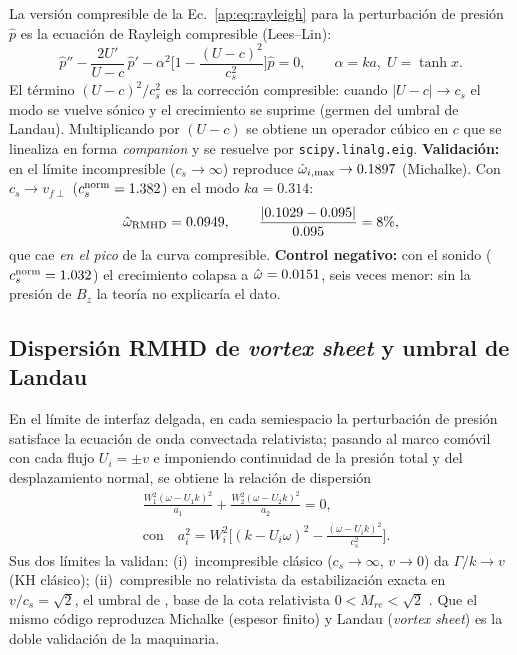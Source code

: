 \primerparrafo La versión compresible de la Ec.~\eqref{ap:eq:rayleigh} para la perturbación de presión $\hat p$ es la ecuación de Rayleigh compresible (Lees--Lin):
\begin{equation}
\hat p''-\frac{2U'}{U-c}\,\hat p'
 -\alpha^2\Big[1-\frac{(U-c)^2}{c_s^2}\Big]\hat p=0,
\qquad \alpha=ka,\;U=\tanh x .
\label{ap:eq:leeslin}
\end{equation}
El término $(U-c)^2/c_s^2$ es la corrección compresible: cuando $|U-c|\to c_s$ el modo se vuelve sónico y el crecimiento se suprime (germen del umbral de Landau). Multiplicando por $(U-c)$ se obtiene un operador cúbico en $c$ que se linealiza en forma \emph{companion} y se resuelve por \texttt{scipy.linalg.eig}. \textbf{Validación:} en el límite incompresible ($c_s\to\infty$) reproduce $\hat{\omega}_{i,\max}\to0.1897$ (Michalke). Con $c_s\to v_{f\perp}$ ($c_s^{\rm norm}=1.382$) en el modo $ka=0.314$:
\begin{equation}
\hat{\omega}_{\mathrm{RMHD}}=0.0949,\qquad \frac{|0.1029-0.095|}{0.095}=8\% ,
\end{equation}
que cae \emph{en el pico} de la curva compresible. \textbf{Control negativo:} con el sonido ($c_s^{\rm norm}=1.032$) el crecimiento colapsa a $\hat{\omega}=0.0151$, seis veces menor: sin la presión de $B_z$ la teoría no explicaría el dato.

\subsection{Dispersión RMHD de \emph{vortex sheet} y umbral de Landau}
\label{ap:vs}

\primerparrafo En el límite de interfaz delgada, en cada semiespacio la perturbación de presión satisface la ecuación de onda convectada relativista; pasando al marco comóvil con cada flujo $U_i=\pm v$ e imponiendo continuidad de la presión total y del desplazamiento normal, se obtiene la relación de dispersión
\begin{equation}
\begin{aligned}
&\frac{W_1^2(\omega-U_1k)^2}{a_1}+\frac{W_2^2(\omega-U_2k)^2}{a_2}=0,\\[2pt]
&\text{con}\quad a_i^2=W_i^2\Big[(k-U_i\omega)^2-\frac{(\omega-U_ik)^2}{c_s^2}\Big] .
\end{aligned}
\label{ap:eq:DR}
\end{equation}
Sus dos límites la validan: (i)~incompresible clásico ($c_s\to\infty$, $v\to0$) da $\Gamma/k\to v$ (KH clásico); (ii)~compresible no relativista da estabilización exacta en $v/c_s=\sqrt2$, el umbral de \textcite{landau1944}, base de la cota relativista $0<M_{re}<\sqrt2$ \parencite{bodo-2004,chow2023}. Que el mismo código reproduzca Michalke (espesor finito) y Landau (\emph{vortex sheet}) es la doble validación de la maquinaria.

